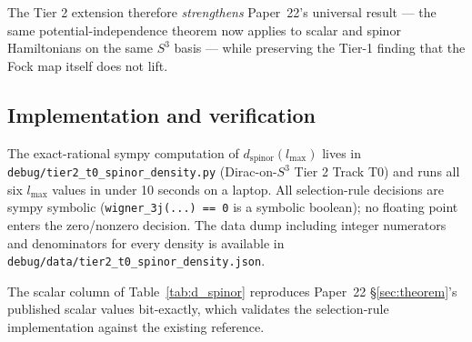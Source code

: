 \documentclass[twocolumn,pra,amsmath,amssymb,superscriptaddress]{revtex4-2}
\begin{document}
The Tier 2 extension therefore \emph{strengthens} Paper~22's universal
result --- the same potential-independence theorem now applies to
scalar and spinor Hamiltonians on the same $S^3$ basis --- while
preserving the Tier-1 finding that the Fock map itself does not lift.

\subsection{Implementation and verification}

The exact-rational sympy computation of $d_{\mathrm{spinor}}(l_{\max})$
lives in \texttt{debug/tier2\_t0\_spinor\_density.py} (Dirac-on-$S^3$
Tier 2 Track T0) and runs all six $l_{\max}$ values in under 10
seconds on a laptop. All selection-rule decisions are sympy symbolic
(\texttt{wigner\_3j(...) == 0} is a symbolic boolean); no floating
point enters the zero/nonzero decision. The data dump including
integer numerators and denominators for every density is available
in \texttt{debug/data/tier2\_t0\_spinor\_density.json}.

The scalar column of Table~\ref{tab:d_spinor} reproduces Paper~22
\S\ref{sec:theorem}'s published scalar values bit-exactly, which
validates the selection-rule implementation against the existing
reference.
\end{document}
